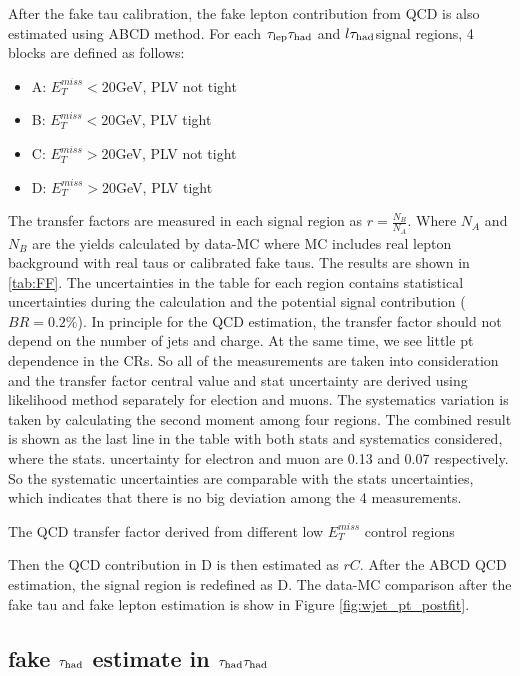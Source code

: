 After the fake tau calibration, the fake lepton contribution from QCD is also estimated using ABCD method. For each $\tau_\text{lep}{}\tau_\text{had}$ and $l\tau_\text{had}$signal regions, 4 blocks are defined as follows:

\begin{itemize}
	\item A: $E_T^{miss}<20$GeV, PLV not tight
	\item B: $E_T^{miss}<20$GeV, PLV tight
	\item C: $E_T^{miss}>20$GeV, PLV not tight
	\item D: $E_T^{miss}>20$GeV, PLV tight
\end{itemize}
The transfer factors are measured in each signal region as $r=\frac{N_B}{N_A}$. Where $N_A$ and $N_B$ are the yields calculated by data-MC where MC includes real lepton background with real taus or calibrated fake taus. The results are shown in \ref{tab:FF}. The uncertainties in the table for each region contains statistical uncertainties during the calculation and the potential signal contribution ($BR=0.2\%$). In principle for the QCD estimation, the transfer factor should not depend on the number of jets and charge. At the same time, we see little pt dependence in the CRs. So all of the measurements are taken into consideration and the transfer factor central value and stat uncertainty are derived using likelihood method separately for election and muons. The systematics variation is taken by calculating the second moment among four regions. The combined result is shown as the last line in the table with both stats and systematics considered, where the stats. uncertainty for electron and muon are 0.13 and 0.07 respectively. So the systematic uncertainties are comparable with the stats uncertainties, which indicates that there is no big deviation among the 4 measurements.

\begin{table}
\caption{The QCD transfer factor derived from different low $E_T^{miss}$ control regions}
\label{tab:FF}

\end{table}

Then the QCD contribution in D is then estimated as $rC$. After the ABCD QCD estimation, the signal region is redefined as D.
The data-MC comparison after the fake tau and fake lepton estimation is show in Figure \ref{fig:wjet_pt_postfit}.


\subsection{fake $\tau_\text{had}$ estimate in $\tau_\text{had}{}\tau_\text{had}$}
\label{sec:ss_method}

